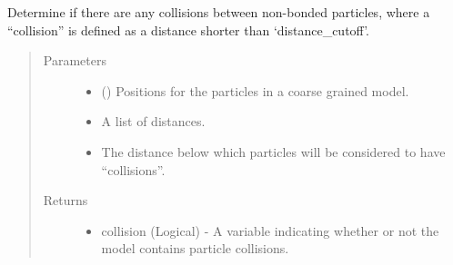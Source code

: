 \documentclass[letterpaper,12pt,english,openany,oneside]{sphinxmanual}
\begin{document}
\begin{fulllineitems}
\label{\detokenize{utilities:utilities.util.collisions}}
Determine if there are any collisions between non-bonded
particles, where a “collision” is defined as a distance shorter than ‘distance\_cutoff’.
\begin{quote}\begin{description}
\item[{Parameters}] \leavevmode\begin{itemize}
\item {} 
 (\sphinxstyleliteralemphasis{\sphinxupquote{( }}\sphinxstyleliteralemphasis{\sphinxupquote{ ( }}\sphinxstyleliteralemphasis{\sphinxupquote{ ) }}\sphinxstyleliteralemphasis{\sphinxupquote{)}}) \textendash{} Positions for the particles in a coarse grained model.

\item {} 
 \textendash{} A list of distances.

\item {} 
 \textendash{} The distance below which particles will be considered to have “collisions”.

\end{itemize}

\item[{Returns}] \leavevmode
\begin{itemize}
\item {} 
collision (Logical) - A variable indicating whether or not the model contains particle collisions.

\end{itemize}


\end{description}\end{quote}

\end{fulllineitems}

\end{document}
